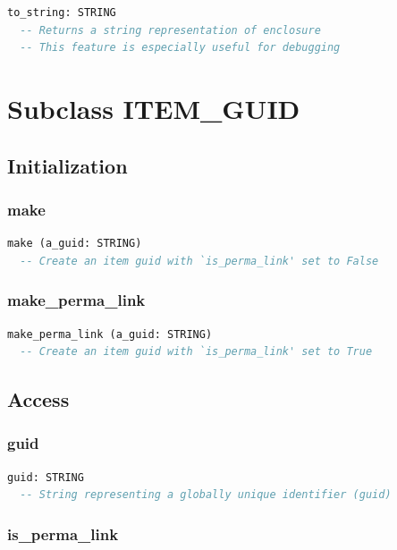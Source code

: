 \begin{lstlisting}[language=Eiffel]
to_string: STRING
  -- Returns a string representation of enclosure
  -- This feature is especially useful for debugging
\end{lstlisting}


\section{Subclass ITEM\_GUID}
\label{sec:item-guid}

\subsection{Initialization}
\label{sec:item-guid-initialization}

\subsubsection{make}

\begin{lstlisting}[language=Eiffel]
make (a_guid: STRING)
  -- Create an item guid with `is_perma_link' set to False
\end{lstlisting}

\subsubsection{make\_perma\_link}

\begin{lstlisting}[language=Eiffel]
make_perma_link (a_guid: STRING)
  -- Create an item guid with `is_perma_link' set to True
\end{lstlisting}

\subsection{Access}
\label{sec:item-guid-access}

\subsubsection{guid}

\begin{lstlisting}[language=Eiffel]
guid: STRING
  -- String representing a globally unique identifier (guid)
\end{lstlisting}

\subsubsection{is\_perma\_link}

